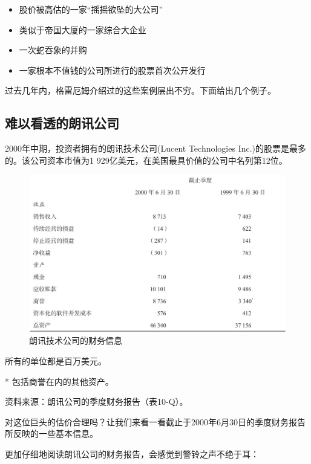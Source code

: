 \documentclass[12pt,oneside]{book}
\begin{document}
\begin{itemize}
\item 股价被高估的一家“摇摇欲坠的大公司”
\item 类似于帝国大厦的一家综合大企业
\item 一次蛇吞象的并购
\item 一家根本不值钱的公司所进行的股票首次公开发行
\end{itemize}

过去几年内，格雷厄姆介绍过的这些案例层出不穷。下面给出几个例子。

\subsection{难以看透的朗讯公司}
2000年中期，投资者拥有的朗讯技术公司(Lucent Technologies Inc.)的股票是最多的。该公司资本市值为1 929亿美元，在美国最具价值的公司中名列第12位。

\begin{figure}[H]
\centering
\includegraphics[width=\linewidth ,totalheight=0.95\textheight , keepaspectratio]{朗讯技术公司的财务信息.jpg}
\caption{朗讯技术公司的财务信息}
\end{figure}

所有的单位都是百万美元。

* 包括商誉在内的其他资产。

资料来源：朗讯公司的季度财务报告（表10-Q）。

对这位巨头的估价合理吗？让我们来看一看截止于2000年6月30日的季度财务报告所反映的一些基本信息。

更加仔细地阅读朗讯公司的财务报告，会感觉到警铃之声不绝于耳：
\end{document}
